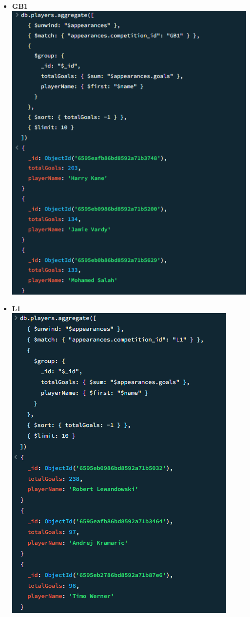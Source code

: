 \documentclass{Configuration_Files/PoliMi3i_thesis}
\begin{document}
\begin{itemize}
    \newpage
    \item \textbf{GB1}\\
    \includegraphics[scale=0.8]{Images/Queries/Competitions_statistics/top_goalscorers/GB1.png}
    \item \textbf{L1}\\
    \includegraphics[scale=0.8]{Images/Queries/Competitions_statistics/top_goalscorers/L1.png}
\end{itemize}
\end{document}
